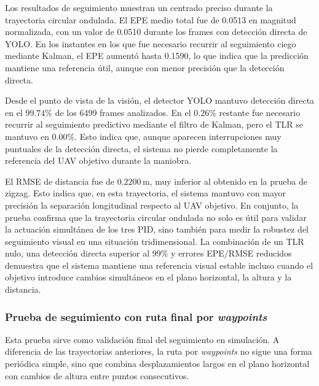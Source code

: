 \vspace{0.3cm}

Los resultados de seguimiento muestran un centrado preciso durante la trayectoria circular ondulada. El EPE medio total fue de 0.0513 en magnitud normalizada, con un valor de 0.0510 durante los frames con detección directa de YOLO. En los instantes en los que fue necesario recurrir al seguimiento ciego mediante Kalman, el EPE aumentó hasta 0.1590, lo que indica que la predicción mantiene una referencia útil, aunque con menor precisión que la detección directa.

\vspace{0.3cm}

Desde el punto de vista de la visión, el detector YOLO mantuvo detección directa en el $99.74\%$ de los 6499 frames analizados. En el $0.26\%$ restante fue necesario recurrir al seguimiento predictivo mediante el filtro de Kalman, pero el TLR se mantuvo en $0.00\%$. Esto indica que, aunque aparecen interrupciones muy puntuales de la detección directa, el sistema no pierde completamente la referencia del UAV objetivo durante la maniobra.

\vspace{0.3cm}

El RMSE de distancia fue de $0.2200\,\mathrm{m}$, muy inferior al obtenido en la prueba de zigzag. Esto indica que, en esta trayectoria, el sistema mantuvo con mayor precisión la separación longitudinal respecto al UAV objetivo. En conjunto, la prueba confirma que la trayectoria circular ondulada no solo es útil para validar la actuación simultánea de los tres PID, sino también para medir la robustez del seguimiento visual en una situación tridimensional. La combinación de un TLR nulo, una detección directa superior al $99\%$ y errores EPE/RMSE reducidos demuestra que el sistema mantiene una referencia visual estable incluso cuando el objetivo introduce cambios simultáneos en el plano horizontal, la altura y la distancia.

\subsubsection{Prueba de seguimiento con ruta final por \textit{waypoints}}

Esta prueba sirve como validación final del seguimiento en simulación. A diferencia de las trayectorias anteriores, la ruta por \textit{waypoints} no sigue una forma periódica simple, sino que combina desplazamientos largos en el plano horizontal con cambios de altura entre puntos consecutivos.

